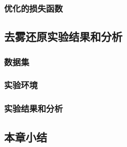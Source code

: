 \subsubsection{优化的损失函数}


\subsection{去雾还原实验结果和分析}

\subsubsection{数据集}

\subsubsection{实验环境}

\subsubsection{实验结果和分析}


\subsection{本章小结}


